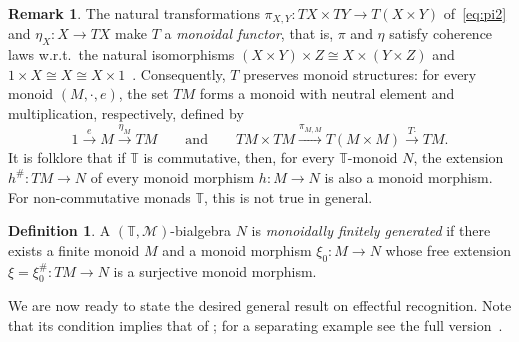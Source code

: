 \documentclass[a4paper, UKenglish, numberwithinsect, thm-restate, cleveref, final]{lipics-v2021}
\theoremstyle{plain}
\theoremstyle{definition}
\newtheorem{defn}[theorem]{Definition} \newtheorem{expl}[theorem]{Example} \newtheorem{rem}[theorem]{Remark} \newtheorem{notn}[theorem]{Notation} \newtheorem{assumption}[theorem]{Assumption}
\newcommand{\T}{\ensuremath{\mathbb{T}}\xspace}
\newcommand{\M}{\ensuremath{\mathcal{M}}\xspace}
\newcommand{\xto}{\xrightarrow}
\newcommand{\mult}{\mathbin{\boldsymbol{\cdot}}}
\numberwithin{equation}{section}
\begin{document}
\begin{rem}\label{rem:mon-functor}
The natural transformations $\pi_{X,Y}\colon TX\times TY\to T(X\times Y)$ of~\eqref{eq:pi2} and
$\eta_X\colon X\to TX$ make $T$ a \emph{monoidal functor}, that is, $\pi$ and $\eta$ satisfy
coherence laws w.r.t.\ the natural isomorphisms $(X\times Y)\times Z \cong X\times (Y\times Z)$
and $1\times X\cong X\cong X\times 1$~\cite[Thm.~2.1]{kock70}. Consequently, $T$ preserves monoid structures: for
every monoid $(M,\mult,e)$, the set $TM$ forms a monoid with neutral element and multiplication,
respectively, defined by
\[ 1\xto{e} M\xto{\eta_M} TM\qquad\text{and}\qquad TM\times TM \xto{\pi_{M,M}} T(M\times
  M)\xto{T\mult} TM.\]
It is folklore that if $\T$ is commutative, then, for every $\T$-monoid $N$, the extension $h^{\#} \colon TM \rightarrow N$
of every monoid morphism $h \colon M \rightarrow N$ is also a monoid morphism. For non-commutative monads \(\T\), this is not true in general.
\end{rem}

\begin{defn}\label{def:mon-fin-gen}
 A $(\T,\M)$-bialgebra $N$ is \emph{monoidally finitely generated} if there exists a finite monoid $M$ and a monoid morphism $\xi_{0}\colon M\to N$ whose free extension $\xi = \xi_{0}^\#\colon TM\to N$ is a surjective monoid morphism.
\end{defn}

We are now ready to state the desired general result on effectful recognition. 
Note that its condition implies that of ; for a separating example see the full version~\cite{this-paper}. 
\end{document}

